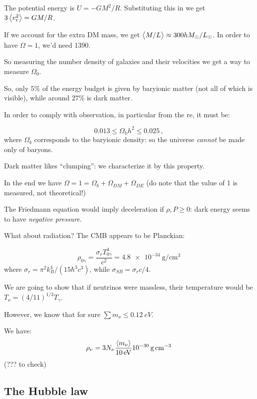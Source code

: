 \documentclass[main.tex]{subfiles}
\begin{document}
The potential energy is \(U = - G M^2 /R\). Substituting this in we get \(3 \expval{v_r^2} = GM/R\).

If we account for the extra DM mass, we get \(\expval{M/L} \approx 300 h M_\odot / L_\odot\).
In order to have \(\Omega = 1\), we'd need 1390.

So measuring the number density of galaxies and their velocities we get a way to measure \(\Omega_0\).

So, only \(5\%\) of the energy budget is given by baryionic matter (not all of which is visible), while around \(27\%\) is dark matter.

In order to comply with observation, in particular from the re, it must be:

\begin{equation}
  0.013 \leq \Omega_{\text{b}} h^2 \leq 0.025\,,
\end{equation}
%
where \(\Omega_b\) corresponds to the baryionic density: so the universe \emph{cannot} be made only of baryons.

Dark matter likes ``clumping'': we characterize it by this property.

In the end we have \(\Omega = 1 = \Omega_b + \Omega_{DM} + \Omega_{DE}\) (do note that the value of 1 is measured, not theoretical!)

The Friedmann equation would imply deceleration if \(\rho, P \geq 0\): dark energy seems to have \emph{negative pressure}.

What about radiation? The CMB appears to be Planckian:

\begin{equation}
  \rho_{0 \gamma} = \frac{\sigma_r T_{0 \gamma}^4}{c^2} = \SI{4.8e-34}{\gram\per\centi\metre\cubed}
\end{equation}
%
where \(\sigma_r = \pi^2 k_B^4 / (15 \hbar ^3 c^3)\), while \(\sigma_{SB} = \sigma_r c /4\).

We are going to show that if neutrinos were massless, their temperature would be \(T_\nu = (4/11)^{1/3} T_\gamma\).

However, we know that for sure \(\sum m_\nu \leq \SI{0.12}{eV} \).

We have:
%
\begin{equation}
  \rho_\nu = 3 N_\nu \frac{\expval{m_\nu} }{\SI{10}{eV}} \SI{e-30}{\gram\per\cubic\centi\metre}
\end{equation}
(??? to check)

\subsection{The Hubble law}
\end{document}
